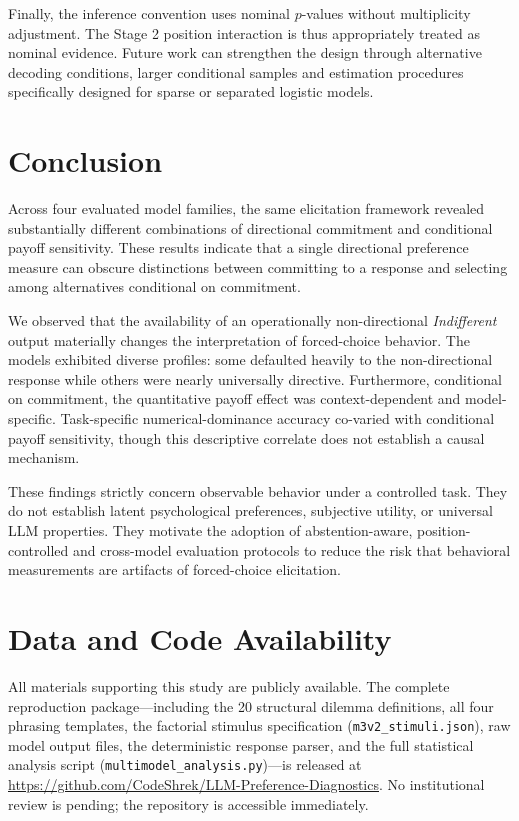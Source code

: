 \documentclass[10pt,journal,compsoc]{IEEEtran}
\begin{document}
Finally, the inference convention uses nominal $p$-values without multiplicity adjustment. The Stage 2 position interaction is thus appropriately treated as nominal evidence. Future work can strengthen the design through alternative decoding conditions, larger conditional samples and estimation procedures specifically designed for sparse or separated logistic models.

\section{Conclusion}
\label{sec:conclusion}

Across four evaluated model families, the same elicitation framework revealed substantially different combinations of directional commitment and conditional payoff sensitivity. These results indicate that a single directional preference measure can obscure distinctions between committing to a response and selecting among alternatives conditional on commitment.

We observed that the availability of an operationally non-directional \textit{Indifferent} output materially changes the interpretation of forced-choice behavior. The models exhibited diverse profiles: some defaulted heavily to the non-directional response while others were nearly universally directive. Furthermore, conditional on commitment, the quantitative payoff effect was context-dependent and model-specific. Task-specific numerical-dominance accuracy co-varied with conditional payoff sensitivity, though this descriptive correlate does not establish a causal mechanism.

These findings strictly concern observable behavior under a controlled task. They do not establish latent psychological preferences, subjective utility, or universal LLM properties. They motivate the adoption of abstention-aware, position-controlled and cross-model evaluation protocols to reduce the risk that behavioral measurements are artifacts of forced-choice elicitation.

\section*{Data and Code Availability}
All materials supporting this study are publicly available. The complete reproduction package---including the 20 structural dilemma definitions, all four phrasing templates, the factorial stimulus specification (\texttt{m3v2\_stimuli.json}), raw model output files, the deterministic response parser, and the full statistical analysis script (\texttt{multimodel\_analysis.py})---is released at \url{https://github.com/CodeShrek/LLM-Preference-Diagnostics}. No institutional review is pending; the repository is accessible immediately.



\end{document}
